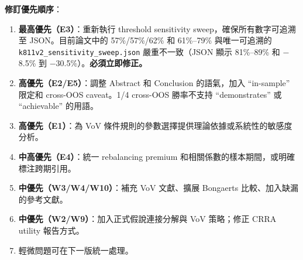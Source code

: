 \documentclass[12pt,a4paper]{article}
\begin{document}
\textbf{修訂優先順序}：
\begin{enumerate}
\item \textcolor{errorred}{\textbf{最高優先（E3）}}：重新執行 threshold sensitivity sweep，確保所有數字可追溯至 JSON。目前論文中的 57\%/57\%/62\% 和 61\%--79\% 與唯一可追溯的 \texttt{k811v2\_sensitivity\_sweep.json} 嚴重不一致（JSON 顯示 81\%--89\% 和 $-$8.5\% 到 $-$30.5\%）。\textbf{必須立即修正。}
\item \textcolor{errorred}{\textbf{高優先（E2/E5）}}：調整 Abstract 和 Conclusion 的語氣，加入 ``in-sample'' 限定和 cross-OOS caveat。1/4 cross-OOS 勝率不支持 ``demonstrates'' 或 ``achievable'' 的用語。
\item \textcolor{errorred}{\textbf{高優先（E1）}}：為 VoV 條件規則的參數選擇提供理論依據或系統性的敏感度分析。
\item \textcolor{errorred}{\textbf{中高優先（E4）}}：統一 rebalancing premium 和相關係數的樣本期間，或明確標注跨期引用。
\item \textcolor{warncolor}{\textbf{中優先（W3/W4/W10）}}：補充 VoV 文獻、擴展 Bongaerts 比較、加入缺漏的參考文獻。
\item \textcolor{warncolor}{\textbf{中優先（W2/W9）}}：加入正式假說連接分解與 VoV 策略；修正 CRRA utility 報告方式。
\item 輕微問題可在下一版統一處理。
\end{enumerate}
\end{document}
